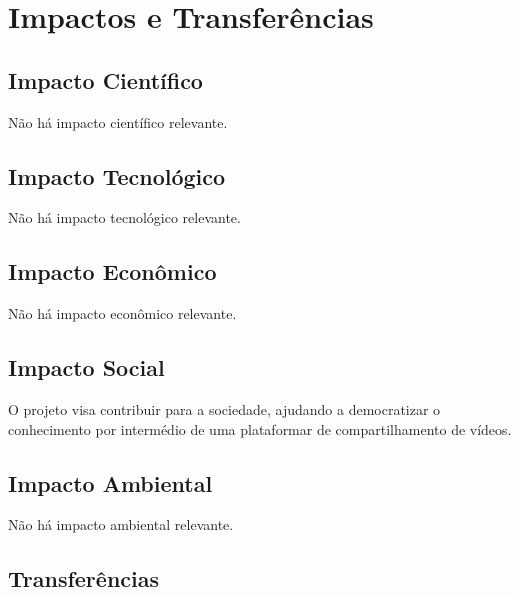 \documentclass[a4paper,10pt]{article} %
\begin{document}
\section{Impactos e Transferências}

\subsection{Impacto Científico}

Não há impacto científico relevante.

\subsection{Impacto Tecnológico}

Não há impacto tecnológico relevante.

\subsection{Impacto Econômico}

Não há impacto econômico relevante.

\subsection{Impacto Social}

O projeto visa contribuir para a sociedade, ajudando a democratizar o conhecimento por intermédio de uma plataformar de compartilhamento de vídeos. 

\subsection{Impacto Ambiental}

Não há impacto ambiental relevante.

\subsection{Transferências}
\end{document}
